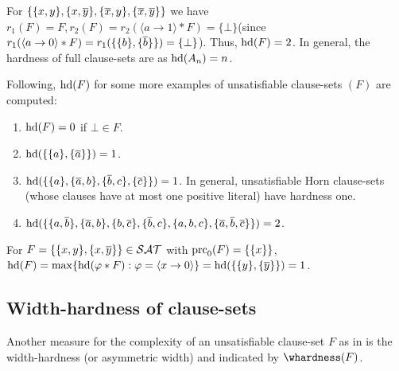 \documentclass{report}
\begin{document}
\begin{examp}\label{exp:harducls}
For $\{ \{ x,y \},\{ x,\overline{y} \},\{ \overline{x},y \},\{ \overline{x},\overline{y} \} \}$ we have $r_1(F)=F, r_2(F)=r_2( \langle a \rightarrow 1 \rangle * F) = \{ \bot \}$(since $r_1( \langle a \rightarrow 0 \rangle * F)=r_1 (\{\{ b \}, \{ \overline b \}\}) = \{ \bot \}$). Thus, $\operatorname{hd}(F) = 2$. In general, the hardness of full clause-sets are as $\operatorname{hd}(A_n)=n$.
  
Following, $\operatorname{hd}(F)$ for some more examples of unsatisfiable clause-sets $(F)$ are computed:
  \begin{enumerate}
  \item $\operatorname{hd}(F) = 0$ if $\bot \in F$.
  \item $\operatorname{hd}(\{ \{ a \},\{ \overline{a} \} \}) = 1$.
  \item $\operatorname{hd}(\{ \{ a \},\{ \overline{a},b \}, \{ \overline{b},c \}, \{ \overline{c} \} \}) = 1$. In general, unsatisfiable Horn clause-sets (whose clauses have at most one positive literal) have hardness one.
  \item $\operatorname{hd}(\{ \{ a,\overline{b} \},\{ \overline{a},b \},\{ b,\overline{c} \},\{ \overline{b},c \},\{ a,b,c \},\{ \overline{a},\overline{b},\overline{c} \} \}) = 2$.
  \end{enumerate}
\end{examp}

\begin{examp}\label{exp:hd-extd}
For $F = \{ \{ x, y \} , \{ x,\overline y \} \} \in \mathcal{SAT}$ with $\operatorname{prc}_0(F) = \{ \{ x \} \}$,  $\operatorname{hd}(F)= \max \{  \operatorname{hd}(\varphi * F) : \varphi =\langle x \rightarrow 0 \rangle  \}=\operatorname{hd}(\{ \{ y \},\{ \overline y \} \})=1$.
\end{examp}
\subsection{Width-hardness of clause-sets}
\label{sec:whdd}

Another measure for the complexity of an unsatisfiable clause-set $F$ as in \cite{BeyersdorffKullmann2014PHP, BeyersdorffGwynneKullmann2013PHPER} is the width-hardness (or asymmetric width) and indicated by $\whardness(F)$. 
\end{document}
